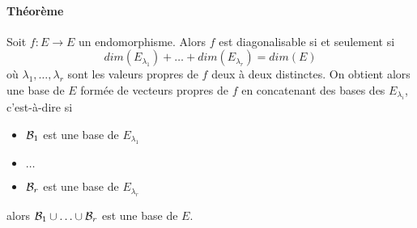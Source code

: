 \paragraph{Théorème} Soit $f: E \rightarrow E$ un endomorphisme. Alors $f$ est diagonalisable si et seulement si
$$dim(E_{\lambda_1}) + \ldots + dim(E_{\lambda_r}) = dim(E)$$
où $\lambda_1, \ldots, \lambda_r$ sont les valeurs propres de $f$ deux à deux distinctes. On obtient alors une base de $E$ formée de vecteurs propres de $f$ en concatenant des bases des $E_{\lambda_i}$, c'est-à-dire si
\begin{itemize}
  \item $\mathcal{B}_1$ est une base de $E_{\lambda_1}$
  \item $\ldots$
  \item $\mathcal{B}_r$ est une base de $E_{\lambda_r}$
\end{itemize}
alors $\mathcal{B}_1 \cup \ldots \cup \mathcal{B}_r$ est une base de $E$.
